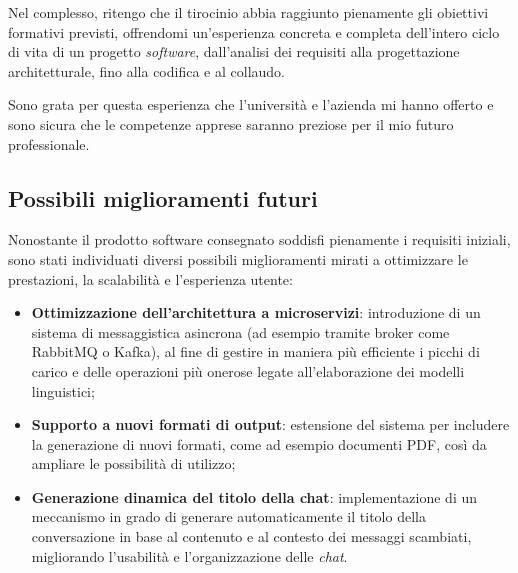 Nel complesso, ritengo che il tirocinio abbia raggiunto pienamente gli obiettivi 
formativi previsti, offrendomi un'esperienza concreta e completa dell'intero ciclo di 
vita di un progetto \textit{software}, dall'analisi dei requisiti alla progettazione 
architetturale, fino alla codifica e al collaudo. 

Sono grata per questa esperienza che l'università e l'azienda mi hanno offerto e sono 
sicura che le competenze apprese saranno preziose per il mio futuro professionale.

\subsection{Possibili miglioramenti futuri}
Nonostante il prodotto software consegnato soddisfi pienamente i requisiti iniziali, 
sono stati individuati diversi possibili miglioramenti mirati a ottimizzare le prestazioni, 
la scalabilità e l'esperienza utente:
\begin{itemize}
    \item \textbf{Ottimizzazione dell’architettura a microservizi}: introduzione di un sistema 
    di messaggistica asincrona (ad esempio tramite broker come RabbitMQ o 
    Kafka), al fine di gestire in maniera più efficiente i picchi di carico e delle 
    operazioni più onerose legate all’elaborazione dei modelli linguistici;
    \item \textbf{Supporto a nuovi formati di output}: estensione del sistema per includere 
    la generazione di nuovi formati, come ad esempio documenti PDF, così da ampliare le 
    possibilità di utilizzo;
    \item \textbf{Generazione dinamica del titolo della chat}: implementazione di un meccanismo 
    in grado di generare automaticamente il titolo della conversazione in base al contenuto 
    e al contesto dei messaggi scambiati, migliorando l’usabilità e l’organizzazione delle 
    \textit{chat}.
\end{itemize}